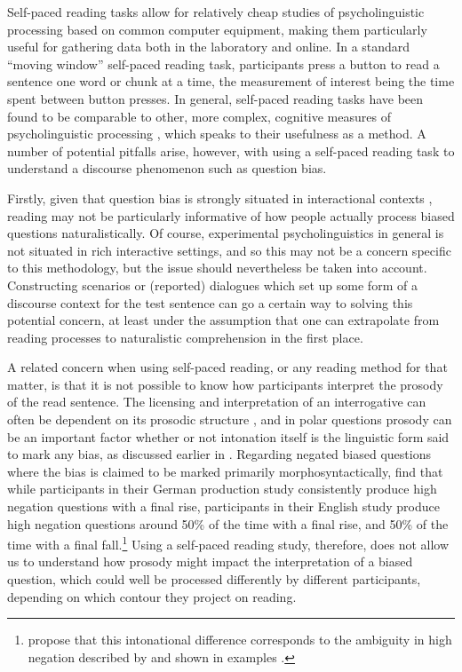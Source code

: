 \documentclass[output=paper,colorlinks,citecolor=brown]{langscibook}
\begin{document}

Self-paced reading tasks \citep{Just1982} allow for relatively cheap studies of psycholinguistic processing based on common computer equipment, making them particularly useful for gathering data both in the laboratory and online. In a standard ``moving window'' self-paced reading task, participants press a button to read a sentence one word or chunk at a time, the measurement of interest being the time spent between button presses. In general, self-paced reading tasks have been found to be comparable to other, more complex, cognitive measures of psycholinguistic processing \citep{Marsden2018}, which speaks to their usefulness as a method. A number of potential pitfalls arise, however, with using a self-paced reading task to understand a discourse phenomenon such as question bias. 

Firstly, given that question bias is strongly situated in interactional contexts \citep[e.g.][]{hennoste2017polar, heritage2021preference}, reading may not be particularly informative of how people actually process biased questions naturalistically. Of course, experimental psycholinguistics in general is not situated in rich interactive settings, and so this may not be a concern specific to this methodology, but the issue should nevertheless be taken into account. Constructing scenarios or (reported) dialogues which set up some form of a discourse context for the test sentence can go a certain way to solving this potential concern, at least under the assumption that one can extrapolate from reading processes to naturalistic comprehension in the first place.

A related concern when using self-paced reading, or any reading method for that matter, is that it is not possible to know how participants interpret the prosody of the read sentence. The licensing and interpretation of an interrogative can often be dependent on its prosodic structure \citep{pierrehumbert_meaning_1990, grice1997can, Vanrell2012, hedberg_meaning_2017}, and in polar questions prosody can be an important factor whether or not intonation itself is the linguistic form said to mark any bias, as discussed earlier in . Regarding negated biased questions where the bias is claimed to be marked primarily morphosyntactically, \citet{domaneschi_bias_2017} find that while participants in their German production study consistently produce high negation questions with a final rise, participants in their English study produce high negation questions around 50\% of the time with a final rise, and 50\% of the time with a final fall.\footnote{\citet{domaneschi_bias_2017} propose that this intonational difference corresponds to the ambiguity in high negation described by \citet{ladd_first_1981} and shown in examples .} Using a self-paced reading study, therefore, does not allow us to understand how prosody might impact the interpretation of a biased question, which could well be processed differently by different participants, depending on which contour they project on reading.
\end{document}
